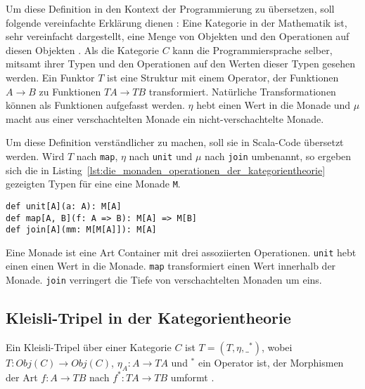 Um diese Definition in den Kontext der Programmierung zu übersetzen, soll folgende vereinfachte Erklärung dienen \cite[vgl.][S.~2--3]{monads_programming}:
Eine Kategorie in der Mathematik ist, sehr vereinfacht dargestellt, eine Menge von Objekten und den Operationen auf diesen Objekten \cite[vgl.][S.~7]{monads_category_theory}.
Als die Kategorie $C$ kann die Programmiersprache selber, mitsamt ihrer Typen und den Operationen auf den Werten dieser Typen gesehen werden\cite[vgl.][S.~6--8]{category_theory_and_programming}.
Ein Funktor $T$ ist eine Struktur mit einem Operator, der Funktionen $A \to B$ zu Funktionen $T A \to T B$ transformiert.
Natürliche Transformationen können als Funktionen aufgefasst werden.
$\eta$ hebt einen Wert in die Monade und $\mu$ macht aus einer verschachtelten Monade ein nicht-verschachtelte Monade.

Um diese Definition verständlicher zu machen, soll sie in Scala-Code übersetzt werden.
Wird $T$ nach \lstinline|map|, $\eta$ nach \lstinline|unit| und $\mu$ nach \lstinline|join| umbenannt, so ergeben sich die in Listing~\ref{lst:die_monaden_operationen_der_kategorientheorie} gezeigten Typen für eine eine Monade \lstinline|M|.

\begin{lstlisting}[caption=Die Monaden-Operationen der Kategorientheorie, label=lst:die_monaden_operationen_der_kategorientheorie]
def unit[A](a: A): M[A]
def map[A, B](f: A => B): M[A] => M[B]
def join[A](mm: M[M[A]]): M[A]
\end{lstlisting}

Eine Monade ist eine Art Container mit drei assoziierten Operationen.
\lstinline|unit| hebt einen einen Wert in die Monade.
\lstinline|map| transformiert einen Wert innerhalb der Monade.
\lstinline|join| verringert die Tiefe von verschachtelten Monaden um eins.


\subsection{Kleisli-Tripel in der Kategorientheorie} %
\label{sub:kleisli_tripel_in_der_kategorientheorie}

Ein Kleisli-Tripel über einer Kategorie $C$ ist $T = (T, \eta, \_^*)$, wobei $T: Obj(C) \to Obj(C)$, $\eta_A: A \to T A$ und $^*$ ein Operator ist, der Morphismen der Art $f: A \to T B$ nach $f^*: T A \to T B$ umformt \cite[vgl.][S.~2]{monads_program_structure}.

